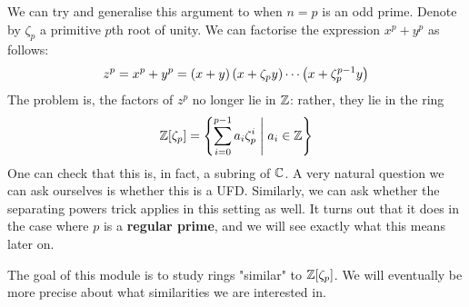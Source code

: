 We can try and generalise this argument to when $n = p$ is an odd prime. Denote by $\zeta_p$ a primitive $p$th root of unity. We can factorise the expression $x^p + y^p$ as follows:
\begin{align*}
    z^p = x^p + y^p = \left( x + y \right)\left( x + \zeta_p y \right) \cdots \left( x + \zeta_p^{p - 1}y \right)
\end{align*}
The problem is, the factors of $z^p$ no longer lie in $\mathbb{Z}$: rather, they lie in the ring
\begin{align*}
    \mathbb{Z}\!\left[ \zeta_p \right] = \left\{ \sum_{i=0}^{p-1}a_i \zeta_p^i \; \middle\vert \; a_i \in \mathbb{Z} \right\}
\end{align*}
One can check that this is, in fact, a subring of $\mathbb{C}$. A very natural question we can ask ourselves is whether this is a UFD. Similarly, we can ask whether the separating powers trick applies in this setting as well. It turns out that it does in the case where $p$ is a \textbf{regular prime}, and we will see exactly what this means later on.

The goal of this module is to study rings "similar" to $\mathbb{Z}\!\left[ \zeta_p \right]$. We will eventually be more precise about what similarities we are interested in.